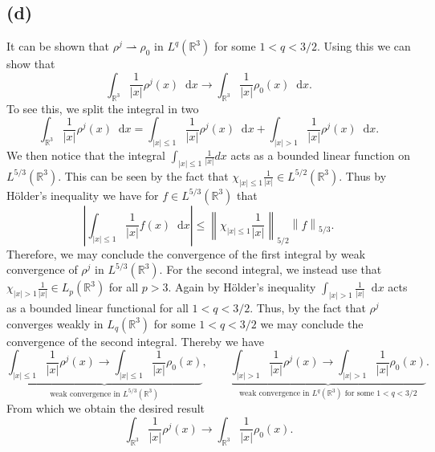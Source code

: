 \documentclass[a4paper,11pt]{article}
\newcommand{\norm}[1]{\left\lVert #1 \right\rVert}
\newcommand{\abs}[1]{\left\lvert #1 \right\rvert}
\newcommand*\diff{\mathop{}\!\mathrm{d}}
\newcommand{\R}{\mathbb{R}}
\numberwithin{equation}{section}
\begin{document}
\subsection*{(d)}
It can be shown that $ \rho^j\rightharpoonup\rho_0 $ in $ L^q(\R^3) $ for some $ 1<q<3/2 $. Using this we can show that \begin{equation}
\int_{\R^3}\frac{1}{\abs{x}}\rho^j(x)\diff x\to\int_{\R^3}\frac{1}{\abs{x}}\rho_0(x)\diff x.
\end{equation}
To see this, we split the integral in two\begin{equation}
\int_{\R^3}\frac{1}{\abs{x}}\rho^j(x)\diff x=\int_{\abs{x}\leq1}\frac{1}{\abs{x}}\rho^j(x)\diff x+\int_{\abs{x}>1}\frac{1}{\abs{x}}\rho^j(x)\diff x.
\end{equation}
We then notice that the integral $ \int_{\abs{x}\leq1}\frac{1}{\abs{x}}dx $ acts as a bounded linear function on $ L^{5/3}(\R^3) $. This can be seen by the fact that $ \chi_{\abs{x}\leq1}\frac{1}{\abs{x}}\in L^{5/2}(\R^3) $. Thus by H\"older's inequality we have for $ f\in L^{5/3}(\R^3) $ that\begin{equation}
\abs{\int_{\abs{x}\leq 1}\frac{1}{\abs{x}}f(x)\diff x}\leq\norm{\chi_{\abs{x}\leq1}\frac{1}{\abs{x}}}_{5/2}\norm{f}_{5/3}.
\end{equation}
Therefore, we may conclude the convergence of the first integral by weak convergence of $ \rho^j $ in $ L^{5/3}(\R^3) $. For the second integral, we instead use that $ \chi_{\abs{x}>1}\frac{1}{\abs{x}}\in L_p(\R^3) $ for all $ p>3 $. Again by H\"older's inequality $ \int_{\abs{x}>1}\frac{1}{\abs{x}}\diff x $ acts as a bounded linear functional for all $ 1<q<3/2 $. Thus, by the fact that $ \rho^j $ converges weakly in $ L_q(\R^3) $ for some $ 1<q<3/2 $ we may conclude the convergence of the second integral. Thereby we have \begin{equation}
\underbrace{\int_{\abs{x}\leq1}\frac{1}{\abs{x}}\rho^j(x)\to\int_{\abs{x}\leq1}\frac{1}{\abs{x}}\rho_0(x)}_{\text{weak convergence in }L^{5/3}(\R^3)},\qquad \underbrace{\int_{\abs{x}>1}\frac{1}{\abs{x}}\rho^j(x)\to\int_{\abs{x}>1}\frac{1}{\abs{x}}\rho_0(x)}_{\text{weak convergence in }L^{q}(\R^3)\text{ for some }1<q<3/2}.
\end{equation}
From which we obtain the desired result \begin{equation}
\int_{\R^3}\frac{1}{\abs{x}}\rho^j(x)\to\int_{\R^3}\frac{1}{\abs{x}}\rho_0(x).
\end{equation}
\end{document}
